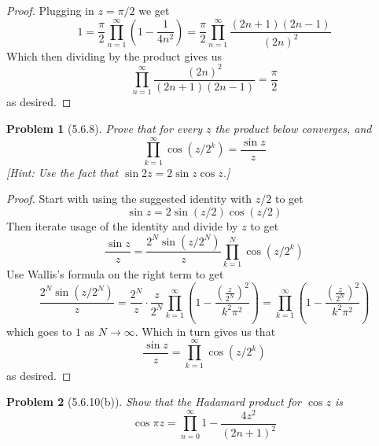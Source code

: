 \documentclass[10pt]{article}
\newcommand{\sk}{\vskip 6mm}
\theoremstyle{plain}
\newtheorem{problem}{Problem}
\theoremstyle{remark}
\begin{document}
\begin{proof}
  Plugging in $z=\pi/2$ we get
  \[
    1=\frac{\pi}{2}\prod_{n=1}^\infty\left(1-\frac{1}{4n^2}\right)=\frac{\pi}{2}\prod_{n=1}^\infty\frac{\left(2n+1\right)\left(2n-1\right)}{\left(2n\right)^2}
  \]
  Which then dividing by the product gives us
  \[
    \prod_{n=1}^\infty\frac{\left(2n\right)^2}{\left(2n+1\right)\left(2n-1\right)}=\frac{\pi}{2}
  \]
  as desired.
\end{proof}

\sk

\begin{problem}[5.6.8]
  Prove that for every $z$ the product below converges, and
  \[
    \prod_{k=1}^\infty \cos\left(z/2^k\right)=\frac{\sin z}{z}
  \]
  [Hint: Use the fact that $\sin 2z=2\sin z\cos z$.]
\end{problem}

\begin{proof}
  Start with using the suggested identity with $z/2$ to get
  \[
    \sin z=2\sin\left(z/2\right)\cos\left(z/2\right)
  \]
  Then iterate usage of the identity and divide by $z$ to get
  \[
    \frac{\sin z}{z} = \frac{2^N\sin\left(z/2^N\right)}{z}\prod_{k=1}^N\cos\left(z/2^k\right)
  \]
  Use Wallis's formula on the right term to get
  \[
    \frac{2^N\sin\left(z/2^N\right)}{z}=\frac{2^N}{z}\cdot\frac{z}{2^N}\prod_{k=1}^\infty\left(1-\frac{\left(\frac{z}{2^N}\right)^2}{k^2\pi^2}\right)=\prod_{k=1}^\infty\left(1-\frac{\left(\frac{z}{2^N}\right)^2}{k^2\pi^2}\right)
  \]
  which goes to $1$ as $N\rightarrow\infty$. Which in turn gives us that
  \[
    \frac{\sin z}{z}=\prod_{k=1}^\infty\cos\left(z/2^k\right)
  \]
  as desired.
\end{proof}

\sk

\begin{problem}[5.6.10(b)]
  Show that the Hadamard product for $\cos z$ is 
  \[
    \cos\pi z=\prod_{n=0}^\infty 1-\frac{4z^2}{\left(2n+1\right)^2}
  \]
\end{problem}
\end{document}
